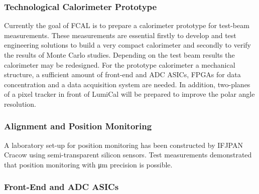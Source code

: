 \subsubsection{Technological Calorimeter Prototype}

Currently the goal of FCAL is to prepare a calorimeter prototype for test-beam measurements. These measurements
are essential firstly to develop and test engineering solutions to build a very compact calorimeter and
secondly to verify the results of Monte Carlo studies. Depending on the test beam
results the calorimeter may be redesigned.
For the prototype calorimeter
a mechanical structure, a sufficient amount of front-end and ADC ASICs, FPGAs for
data concentration and
a data acquisition system are needed. In addition,
two-planes of a pixel tracker in front of LumiCal will be prepared to improve the polar angle resolution.


\subsubsection{Alignment and Position Monitoring }

A laboratory set-up for position monitoring has been constructed by IFJPAN Cracow using semi-transparent
silicon sensors. Test measurements demonstrated that position monitoring with \si{\micro\meter} precision is possible.

\subsubsection{Front-End and ADC ASICs}


